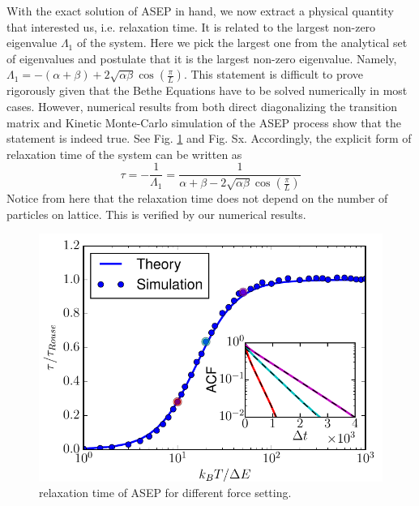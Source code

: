 \documentclass[aps,showpacs,twocolumn,floatfix,prx,superscriptaddress]{revtex4-1}
\begin{document}
With the exact solution of ASEP in hand, we now extract a physical quantity that interested us, i.e. relaxation time. It is related to the largest non-zero eigenvalue $\Lambda_1$ of the system. Here we pick the largest one from the analytical set of eigenvalues and postulate that it is the largest non-zero eigenvalue. Namely, $\Lambda_1 = -(\alpha+\beta) + 2\sqrt{\alpha\beta}\cos(\frac{\pi}{L})$. This statement is difficult to prove rigorously given that the Bethe Equations have to be solved numerically in most cases. However, numerical results from both direct diagonalizing the transition matrix and Kinetic Monte-Carlo simulation of the ASEP process show that the statement is indeed true. See Fig. \ref{fig:relaxation1D} and Fig. Sx. Accordingly, the explicit form of relaxation time of the system can be written as 
\begin{equation}
    \label{eq:relaxationTime}
    \tau = -\frac{1}{\Lambda_1} = \frac{1}{\alpha+\beta-2\sqrt{\alpha\beta}\cos(\frac{\pi}{L})}
\end{equation}
Notice from here that the relaxation time does not depend on the number of particles on lattice. This is verified by our numerical results.
\begin{figure}[htpb]
    \centering
    \includegraphics[width=0.8\linewidth]{relaxation1D}
    \caption{relaxation time of ASEP for different force setting.}
    \label{fig:relaxation1D}
\end{figure}
\end{document}
